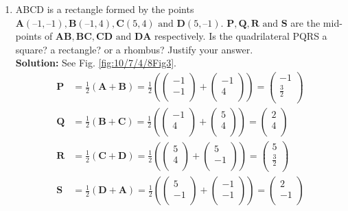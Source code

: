 \documentclass[12pt]{article}
\providecommand{\brak}[1]{\ensuremath{\left(#1\right)}}
\newcommand{\solution}{\noindent \textbf{Solution: }}
\newcommand{\myvec}[1]{\ensuremath{\begin{pmatrix}#1\end{pmatrix}}}
\let\vec\mathbf
\begin{document}
\begin{enumerate}
\item ABCD is a rectangle formed by the points $\vec{A}(–1, –1), \vec{B}(– 1, 4), \vec{ C}(5, 4) \text{ and } \vec{D}(5, – 1)$. $\vec{P,Q,R} \text{ and } \vec{S}$ are the mid-points of $\vec{AB, BC, CD} \text{ and } \vec{DA}$ respectively. Is the quadrilateral
PQRS a square? a rectangle? or a rhombus? Justify your answer. \\
\fi
\solution 
See Fig. \ref{fig:10/7/4/8Fig3}.
\begin{align}
  \label{eq:10/7/4/8det2f}
  \vec{P} &= \frac{1}{2}\brak{\vec{A}+\vec{B}} =   \frac{1}{2}\brak{\myvec{
  -1 \\
  -1 \\
 } + \myvec{
  -1 \\
  4 \\
 } 
 } = \myvec{
 -1 \\
 \frac{3}{2} \\
 }   \\
 \vec{Q} &= \frac{1}{2}\brak{\vec{B}+\vec{C}} =   \frac{1}{2}\brak{\myvec{
  -1 \\
  4 \\
 } + \myvec{
  5 \\
  4 \\
 } 
 } = \myvec{
 2 \\
 4 \\
 }   \\
 \vec{R} &= \frac{1}{2}\brak{\vec{C}+\vec{D}} =   \frac{1}{2}\brak{\myvec{
  5 \\
  4 \\
 } + \myvec{
  5 \\
  -1\\
 } 
 } = \myvec{
 5 \\
 \frac{3}{2} \\
 }   \\
 \vec{S} &= \frac{1}{2}\brak{\vec{D}+\vec{A}} =   \frac{1}{2}\brak{\myvec{
  5 \\
  -1 \\
 } + \myvec{
  -1 \\
  -1\\
 } 
 } = \myvec{
 2\\
 -1 \\
 }   
\end{align}


\end{enumerate}
\end{document}
